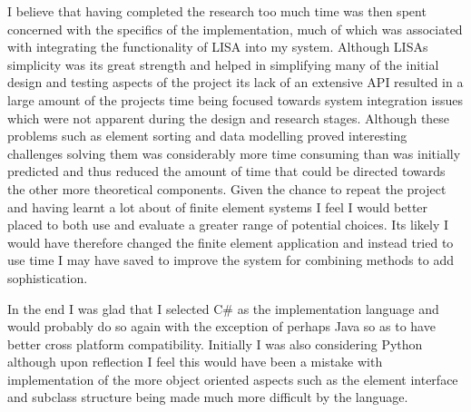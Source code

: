 \noindent
I believe that having completed the research too much time was then spent concerned with the specifics of the implementation, much of which was associated with integrating the functionality of LISA into my system. Although LISAs simplicity was its great strength and helped in simplifying many of the initial design and testing aspects of the project its lack of an extensive API resulted in a large amount of the projects time being focused towards system integration issues which were not apparent during the design and research stages. Although these problems such as element sorting and data modelling proved interesting challenges solving them was considerably more time consuming than was initially predicted and thus reduced the amount of time that could be directed towards the other more theoretical components. Given the chance to repeat the project and having learnt a lot about of finite element systems I feel I would better placed to both use and evaluate a greater range of potential choices. Its likely I would have therefore changed the finite element application and instead tried to use time I may have saved to improve the system for combining methods to add sophistication.

In the end I was glad that I selected C\# as the implementation language and would probably do so again with the exception of perhaps Java so as to have better cross platform compatibility. Initially I was also considering  Python although upon reflection I feel this would have been a mistake with implementation of the more object oriented aspects such as the element interface and subclass structure being made much more difficult by the language.



